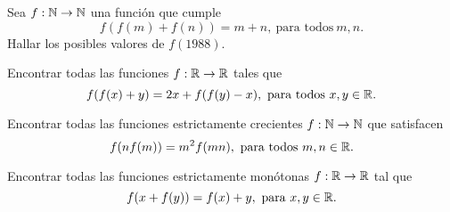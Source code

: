 \begin{prob-without-section}
    Sea $f: \mathbb{N} \to \mathbb{N}$ una función que cumple
    \[
        f(f(m) + f(n)) = m + n,\ \text{para todos}\ m,n.
    \]
    Hallar los posibles valores de $f(1988)$.
\end{prob-without-section}

\begin{prob-without-section}
    Encontrar todas las funciones $f : \mathbb{R} \to \mathbb{R}$ tales que
    \[
        f(f(x) + y) = 2x + f(f(y) - x),\ \text{para todos}\ x,y \in \mathbb{R}.
    \]
\end{prob-without-section}

\begin{prob-without-section}[Ibero, 1993]
    Encontrar todas las funciones estrictamente crecientes $f : \mathbb{N} \to \mathbb{N}$ que satisfacen
    \[
        f(n f(m)) = m^2 f(mn),\ \text{para todos}\ m,n \in \mathbb{R}.
    \]
\end{prob-without-section}

\begin{prob-without-section}[Italia, 1999]
    Encontrar todas las funciones estrictamente monótonas $f : \mathbb{R} \to \mathbb{R}$ tal que
    \[
        f(x + f(y)) = f(x) + y,\ \text{para}\ x,y \in \mathbb{R}.
    \]
\end{prob-without-section}